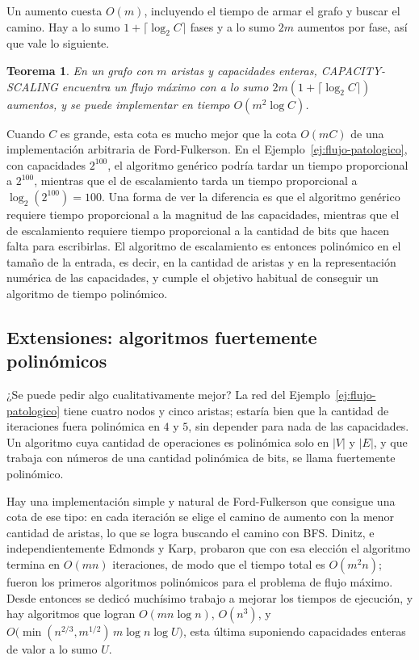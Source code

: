 \documentclass[12pt, spanish, oneside, openany]{book}
\newcommand{\alg}[1]{#1}
\theoremstyle{uprightplain}
\newtheorem{teorema}{Teorema}[section]
\theoremstyle{definition}
\theoremstyle{remark}
\theoremstyle{definition}
\begin{document}
Un aumento cuesta $O(m)$, incluyendo el tiempo de armar el grafo y buscar el camino. Hay a lo sumo $1+\lceil\log_2C\rceil$ fases y a lo sumo $2m$ aumentos por fase, así que vale lo siguiente.

\begin{teorema}
\label{teo:flujo-esc-tiempo}
En un grafo con $m$ aristas y capacidades enteras, \alg{CAPACITY-SCALING} encuentra un flujo máximo con a lo sumo $2m(1+\lceil\log_2C\rceil)$ aumentos, y se puede implementar en tiempo $O(m^2\log C)$.
\end{teorema}

Cuando $C$ es grande, esta cota es mucho mejor que la cota $O(mC)$ de una implementación arbitraria de Ford-Fulkerson. En el Ejemplo~\ref{ej:flujo-patologico}, con capacidades $2^{100}$, el algoritmo genérico podría tardar un tiempo proporcional a $2^{100}$, mientras que el de escalamiento tarda un tiempo proporcional a $\log_2(2^{100})=100$. Una forma de ver la diferencia es que el algoritmo genérico requiere tiempo proporcional a la magnitud de las capacidades, mientras que el de escalamiento requiere tiempo proporcional a la cantidad de bits que hacen falta para escribirlas. El algoritmo de escalamiento es entonces polinómico en el tamaño de la entrada, es decir, en la cantidad de aristas y en la representación numérica de las capacidades, y cumple el objetivo habitual de conseguir un algoritmo de tiempo polinómico.

\subsection{Extensiones: algoritmos fuertemente polinómicos}

¿Se puede pedir algo cualitativamente mejor? La red del Ejemplo~\ref{ej:flujo-patologico} tiene cuatro nodos y cinco aristas; estaría bien que la cantidad de iteraciones fuera polinómica en $4$ y $5$, sin depender para nada de las capacidades. Un algoritmo cuya cantidad de operaciones es polinómica solo en $|V|$ y $|E|$, y que trabaja con números de una cantidad polinómica de bits, se llama fuertemente polinómico.

Hay una implementación simple y natural de Ford-Fulkerson que consigue una cota de ese tipo: en cada iteración se elige el camino de aumento con la menor cantidad de aristas, lo que se logra buscando el camino con BFS. Dinitz, e independientemente Edmonds y Karp, probaron que con esa elección el algoritmo termina en $O(mn)$ iteraciones, de modo que el tiempo total es $O(m^2n)$; fueron los primeros algoritmos polinómicos para el problema de flujo máximo. Desde entonces se dedicó muchísimo trabajo a mejorar los tiempos de ejecución, y hay algoritmos que logran $O(mn\log n)$, $O(n^3)$, y $O\bigl(\min(n^{2/3},m^{1/2})\,m\log n\log U\bigr)$, esta última suponiendo capacidades enteras de valor a lo sumo $U$.
\end{document}
